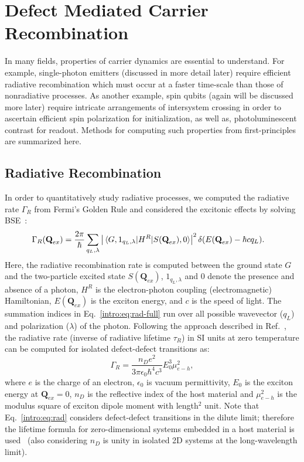 \section{Defect Mediated Carrier Recombination}

In many fields, properties of carrier dynamics are essential to understand. For example, single-photon emitters (discussed in more detail later) require efficient radiative recombination which must occur at a faster time-scale than those of nonradiative processes. As another example, spin qubits (again will be discussed more later) require intricate arrangements of intersystem crossing in order to ascertain efficient spin polarization for initialization, as well as, photoluminescent contrast for readout. Methods for computing such properties from first-principles are summarized here.

\subsection{Radiative Recombination}
In order to quantitatively study radiative processes, we computed the radiative rate $\Gamma_R$ from Fermi's Golden Rule and considered the excitonic effects by solving BSE~\cite{wu2019dimensionality}:
\begin{align}
    \Gamma_R (\textbf{Q}_{ex}) &=
    \frac{2\pi}{\hbar}
    \sum_{q_L, \lambda}
    \left|
        \mel{G,1_{q_L,\lambda}}
        {H^R}
        {S(\textbf{Q}_{ex}),0}
    \right|^2
    \delta(E(\textbf{Q}_{ex}) -\hbar c q_L).
    \label{intro:eq:rad-full}
\end{align}
Here, the radiative recombination rate is computed between the ground state $G$ and the two-particle excited state $S(\textbf{Q}_{ex})$, $1_{q_L,\lambda}$ and 0 denote the presence and absence of a photon, $H^R$ is the electron-photon coupling (electromagnetic) Hamiltonian,  $E(\textbf{Q}_{ex})$ is the exciton energy, and $c$ is the speed of light.
The summation indices in Eq.~\ref{intro:eq:rad-full} run over all possible wavevector ($q_L$) and polarization ($\lambda$) of the photon.
Following the approach described in Ref.~\cite{wu2019dimensionality}, the radiative rate (inverse of radiative lifetime $\tau_R$) in SI units at zero temperature can be computed for isolated defect-defect transitions as:
\begin{equation}
     \Gamma_R = \frac{n_D e^2}{3\pi\epsilon_0\hbar^4 c^3} E_0^3 \mu_{e-h}^2,
    \label{intro:eq:rad}
\end{equation}
where $e$ is the charge of an electron, $\epsilon_0$ is vacuum permittivity, $E_0$ is the exciton energy at $\textbf{Q}_{ex}=0$, $n_D$ is the reflective index of the host material and $\mu_{e-h}^2$ is the modulus square of exciton dipole moment with length$^2$ unit. Note that Eq.~\ref{intro:eq:rad} considers defect-defect transitions in the dilute limit; therefore the lifetime formula for zero-dimensional systems embedded in a host material is used~\cite{gupta2018two,mackoit2019carbon} (also considering $n_D$ is unity in isolated 2D systems at the long-wavelength limit).


